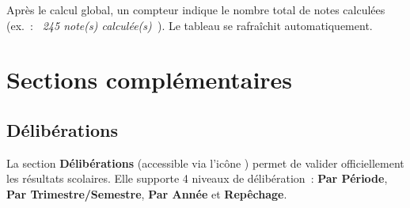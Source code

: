 \begin{resultat}
Apr\`es le calcul global, un compteur indique le nombre total de notes calcul\'ees (ex.~: \textit{\guillemotleft~245 note(s) calcul\'ee(s)~\guillemotright}). Le tableau se rafra\^ichit automatiquement.
\end{resultat}

\chapter{Sections compl\'ementaires}

\section{D\'elib\'erations}

La section \textbf{D\'elib\'erations} (accessible via l'ic\^one \faGavel) permet de valider officiellement les r\'esultats scolaires. Elle supporte 4 niveaux de d\'elib\'eration~: \textbf{Par P\'eriode}, \textbf{Par Trimestre/Semestre}, \textbf{Par Ann\'ee} et \textbf{Rep\^echage}.

